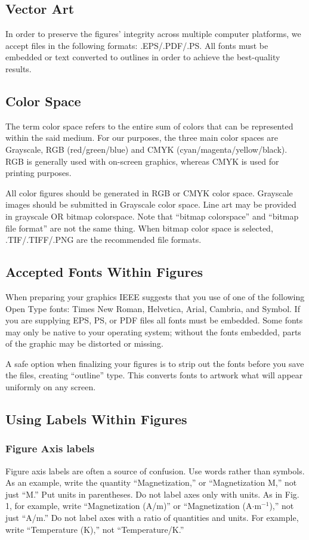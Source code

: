 \documentclass{ieeeaccess}
\begin{document}
\subsection{Vector Art}
In order to preserve the figures' integrity across multiple computer
platforms, we accept files in the following formats: .EPS/.PDF/.PS. All
fonts must be embedded or text converted to outlines in order to achieve the
best-quality results.

\subsection{Color Space}
The term color space refers to the entire sum of colors that can be
represented within the said medium. For our purposes, the three main color
spaces are Grayscale, RGB (red/green/blue) and CMYK
(cyan/magenta/yellow/black). RGB is generally used with on-screen graphics,
whereas CMYK is used for printing purposes.

All color figures should be generated in RGB or CMYK color space. Grayscale
images should be submitted in Grayscale color space. Line art may be
provided in grayscale OR bitmap colorspace. Note that ``bitmap colorspace''
and ``bitmap file format'' are not the same thing. When bitmap color space
is selected, .TIF/.TIFF/.PNG are the recommended file formats.

\subsection{Accepted Fonts Within Figures}
When preparing your graphics IEEE suggests that you use of one of the
following Open Type fonts: Times New Roman, Helvetica, Arial, Cambria, and
Symbol. If you are supplying EPS, PS, or PDF files all fonts must be
embedded. Some fonts may only be native to your operating system; without
the fonts embedded, parts of the graphic may be distorted or missing.

A safe option when finalizing your figures is to strip out the fonts before
you save the files, creating ``outline'' type. This converts fonts to
artwork what will appear uniformly on any screen.

\subsection{Using Labels Within Figures}

\subsubsection{Figure Axis labels }
Figure axis labels are often a source of confusion. Use words rather than
symbols. As an example, write the quantity ``Magnetization,'' or
``Magnetization M,'' not just ``M.'' Put units in parentheses. Do not label
axes only with units. As in Fig. 1, for example, write ``Magnetization
(A/m)'' or ``Magnetization (A$\cdot$m$^{-1}$),'' not just ``A/m.'' Do not label axes with a ratio of quantities and
units. For example, write ``Temperature (K),'' not ``Temperature/K.''
\end{document}
